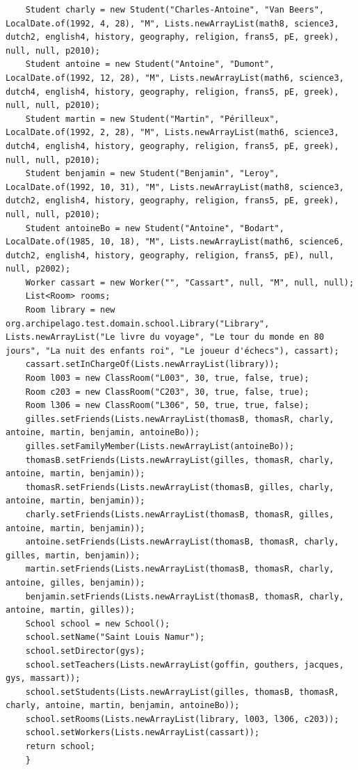\documentclass[a4paper,fleqn,12pt,oneside]{report}
\begin{document}
\begin{lstlisting}
    Student charly = new Student("Charles-Antoine", "Van Beers", LocalDate.of(1992, 4, 28), "M", Lists.newArrayList(math8, science3, dutch2, english4, history, geography, religion, frans5, pE, greek), null, null, p2010);
    Student antoine = new Student("Antoine", "Dumont", LocalDate.of(1992, 12, 28), "M", Lists.newArrayList(math6, science3, dutch4, english4, history, geography, religion, frans5, pE, greek), null, null, p2010);
    Student martin = new Student("Martin", "Périlleux", LocalDate.of(1992, 2, 28), "M", Lists.newArrayList(math6, science3, dutch4, english4, history, geography, religion, frans5, pE, greek), null, null, p2010);
    Student benjamin = new Student("Benjamin", "Leroy", LocalDate.of(1992, 10, 31), "M", Lists.newArrayList(math8, science3, dutch2, english4, history, geography, religion, frans5, pE, greek), null, null, p2010);
    Student antoineBo = new Student("Antoine", "Bodart", LocalDate.of(1985, 10, 18), "M", Lists.newArrayList(math6, science6, dutch2, english4, history, geography, religion, frans5, pE), null, null, p2002);
    Worker cassart = new Worker("", "Cassart", null, "M", null, null);
    List<Room> rooms;
    Room library = new org.archipelago.test.domain.school.Library("Library", Lists.newArrayList("Le livre du voyage", "Le tour du monde en 80 jours", "La nuit des enfants roi", "Le joueur d'échecs"), cassart);
    cassart.setInChargeOf(Lists.newArrayList(library));
    Room l003 = new ClassRoom("L003", 30, true, false, true);
    Room c203 = new ClassRoom("C203", 30, true, false, true);
    Room l306 = new ClassRoom("L306", 50, true, true, false);
    gilles.setFriends(Lists.newArrayList(thomasB, thomasR, charly, antoine, martin, benjamin, antoineBo));
    gilles.setFamilyMember(Lists.newArrayList(antoineBo));
    thomasB.setFriends(Lists.newArrayList(gilles, thomasR, charly, antoine, martin, benjamin));
    thomasR.setFriends(Lists.newArrayList(thomasB, gilles, charly, antoine, martin, benjamin));
    charly.setFriends(Lists.newArrayList(thomasB, thomasR, gilles, antoine, martin, benjamin));
    antoine.setFriends(Lists.newArrayList(thomasB, thomasR, charly, gilles, martin, benjamin));
    martin.setFriends(Lists.newArrayList(thomasB, thomasR, charly, antoine, gilles, benjamin));
    benjamin.setFriends(Lists.newArrayList(thomasB, thomasR, charly, antoine, martin, gilles));
    School school = new School();
    school.setName("Saint Louis Namur");
    school.setDirector(gys);
    school.setTeachers(Lists.newArrayList(goffin, gouthers, jacques, gys, massart));
    school.setStudents(Lists.newArrayList(gilles, thomasB, thomasR, charly, antoine, martin, benjamin, antoineBo));
    school.setRooms(Lists.newArrayList(library, l003, l306, c203));
    school.setWorkers(Lists.newArrayList(cassart));
    return school;
    }
\end{lstlisting}
\label{SchoolObj}
\end{document}
